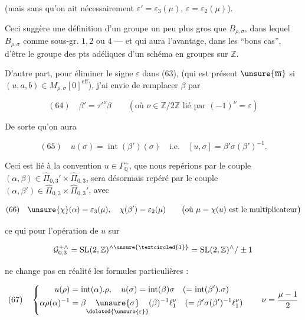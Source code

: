 (mais sans qu'on ait nécessairement
$\varepsilon'=\varepsilon_3(\mu)$, $\varepsilon=\varepsilon_2(\mu)$).

Ceci suggère une définition d'un groupe un peu plus gros que $B_{\rho,\sigma}$,
dans lequel $B_{\rho,\sigma}$  
comme sous-gr.  
$1,2$ ou $4$ --- et qui aura l'avantage, dans les ``bons cas'', d'être le groupe
des pts adéliques d'un schéma en groupes  sur $\mathbb Z$.

D'autre part, pour  éliminer le signe
$\varepsilon$ dans (63), (qui est présent $\unsure{\overline{\mathrm m}}$ si
$(u,a,b)\in M_{\rho,\sigma}[0]^{\mathrm{eff}}$), j'ai envie de remplacer $\beta$ par


\[
(64)\quad \beta'=\tau'^{\nu}\beta
\qquad\left(\text{où }\nu\in\mathbb Z/2\mathbb Z\text{ lié par }
(-1)^\nu=\varepsilon\right)
\]

De sorte qu'on aura

\[
(65)\quad u(\sigma)=\operatorname{int}(\beta')(\sigma)
\quad\text{i.e.}\quad [u,\sigma]=\beta'\sigma(\beta')^{-1}.
\]

Ceci est lié à la convention 
$u\in\Gamma_{\mathbb Q}^{\sim}$, que nous repérions par le couple
$(\alpha,\beta)\in\widehat{\Pi}_{0,3}'\times\widehat{\Pi}_{0,3}$,
sera désormais repéré par le couple
$(\alpha,\beta')\in\widehat{\Pi}_{0,3}\times\widehat{\Pi}_{0,3}'$, avec

\[
(66)\quad\unsure{\chi}(\alpha)=\varepsilon_3(\mu),
\quad\chi(\beta')=\varepsilon_2(\mu)
\qquad\bigl(\text{où }\mu=\chi(u)\text{ est le multiplicateur}\bigr)
\]

ce qui  pour l'opération de $u$ sur

\[
\mathcal G_{0,3}^{+\wedge}
=\mathrm{SL}(2,\mathbb Z)^{\wedge\unsure{\textcircled{1}}}
=\mathrm{SL}(2,\mathbb Z)^{\wedge}/\pm1
\]

ne change pas en réalité les formules particulières :

\[
(67)\quad\left\{\begin{aligned}
u(\rho)&=\operatorname{int}(\alpha).\rho,\quad
u(\sigma)=\operatorname{int}(\beta)\sigma
\quad(=\operatorname{int}(\beta').\sigma)\\
\alpha\rho(\alpha)^{-1}
&=\beta\underset{\deleted{\unsure{\varepsilon}}}{\unsure{\sigma}}(\beta)^{-1}\ell_1^\nu
\quad(=\beta'\sigma(\beta')^{-1}\ell_1^\nu)
\end{aligned}\right.
\qquad\nu=\frac{\mu-1}{2}
\]

